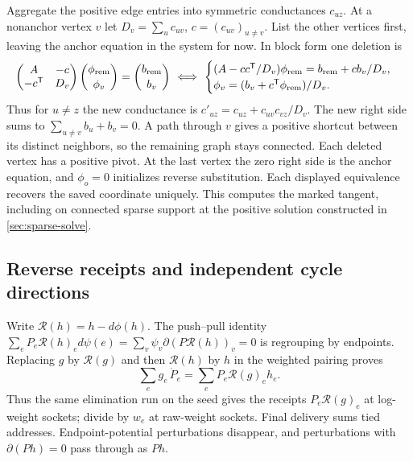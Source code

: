 \documentclass[11pt,a4paper]{article}
\theoremstyle{definition}
\theoremstyle{remark}\newaliascnt{remark}{theorem}
\numberwithin{equation}{section}
\begin{document}
Aggregate the positive edge entries into symmetric conductances \(c_{uz}\). At a nonanchor vertex \(v\) let \(D_v=\sum_u c_{uv}\), \(c=(c_{uv})_{u\ne v}\). List the other vertices first, leaving the anchor equation in the system for now. In block form one deletion is
\[
 \begin{pmatrix}A&-c\\-c^{\mathsf T}&D_v\end{pmatrix}
 \binom{\phi_{\rm rem}}{\phi_v}=\binom{b_{\rm rem}}{b_v}
 \ \Longleftrightarrow\
 \begin{cases}
 (A-cc^{\mathsf T}/D_v)\phi_{\rm rem}= b_{\rm rem}+cb_v/D_v,\\
 \phi_v=(b_v+c^{\mathsf T}\phi_{\rm rem})/D_v .
 \end{cases}
\]
Thus for \(u\ne z\) the new conductance is \(c'_{uz}=c_{uz}+c_{uv}c_{vz}/D_v\). The new right side sums to \(\sum_{u\ne v} b_u+b_v=0\). A path through \(v\) gives a positive shortcut between its distinct neighbors, so the remaining graph stays connected. Each deleted vertex has a positive pivot. At the last vertex the zero right side is the anchor equation, and \(\phi_o=0\) initializes reverse substitution. Each displayed equivalence recovers the saved coordinate uniquely. This computes the marked tangent, including on connected sparse support at the positive solution constructed in \cref{sec:sparse-solve}.

\subsection{Reverse receipts and independent cycle directions}

Write $\mathcal R(h)=h-d\phi(h)$. The push--pull identity
$\sum_e P_e \mathcal R(h)_e d\psi(e)=\sum_v\psi_v\partial(P \mathcal R(h))_v=0$
is regrouping by endpoints. Replacing $g$ by $\mathcal R(g)$ and then $\mathcal R(h)$ by $h$ in the weighted pairing proves
\[
 \sum_e g_e\,\dot P_e=\sum_e P_e \mathcal R(g)_e h_e.
\]
Thus the same elimination run on the seed gives the receipts $P_e\mathcal R(g)_e$ at log-weight sockets; divide by $w_e$ at raw-weight sockets. Final delivery sums tied addresses. Endpoint-potential perturbations disappear, and perturbations with $\partial(Ph)=0$ pass through as $Ph$.
\end{document}
